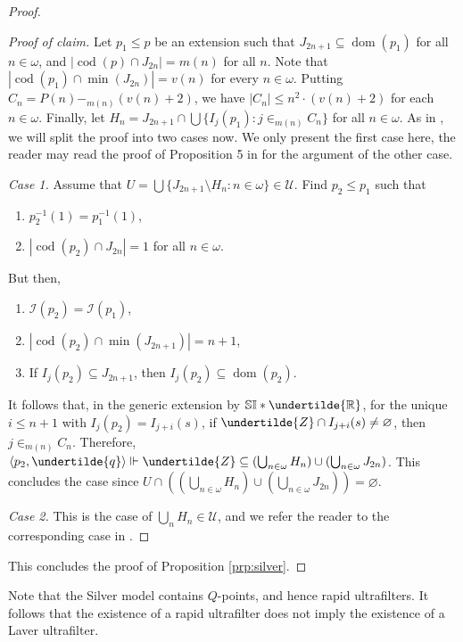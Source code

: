\documentclass[12pt]{article}
\theoremstyle{definition}
\newcommand\dom{\operatorname{dom}}
\begin{document}
\begin{proof}
\begin{proof}[Proof of claim]
Let $p_1\leq p$ be an extension such that $J_{2n+1}\subseteq \dom(p_1)$ for all $n\in\omega$, and $|\operatorname{cod}(p)\cap J_{2n}|=m(n)$ for all $n$. Note that $|\operatorname{cod}(p_1)\cap \min(J_{2n})|=v(n)$ for every $n\in\omega$. Putting $C_n=P(n)-_{m(n)}(v(n)+2)$, we have $|C_n|\leq n^2\cdot(v(n)+2)$ for each $n\in\omega$. Finally, let $H_n=J_{2n+1}\cap \bigcup\{I_j(p_1) : j\in_{m(n)} C_n\}$ for all $n\in\omega$. As in \cite{chodguz-ppoints}, we will split the proof into two cases now. We only present the first case here, the reader may read the proof of Proposition 5 in \cite{chodguz-ppoints} for the argument of the other case.

\emph{Case 1.} Assume that $U=\bigcup \{J_{2n+1}\setminus H_n : n\in\omega\}\in\mathcal{U}$. Find $p_2\leq p_1$ such that
\begin{enumerate}[label=(\roman*)]
    \item $p_2^{-1}(1)=p_1^{-1}(1)$,
    \item $|\operatorname{cod}(p_2)\cap J_{2n}|=1$ for all $n\in\omega$.
\end{enumerate}
But then,
\begin{enumerate}[label=(\roman*)]
    \item $\mathcal{I}(p_2)=\mathcal{I}(p_1)$,
    \item $|\operatorname{cod}(p_2)\cap \min(J_{2n+1})|=n+1$,
    \item If $I_j(p_2)\subseteq J_{2n+1}$, then $I_j(p_2)\subseteq \operatorname{dom}(p_2)$.
\end{enumerate}
It follows that, in the generic extension by $\mathbb{SI}*\undertilde{\mathbb{R}}$, for the unique $i\leq n+1$ with $I_j(p_2)=I_{j+i}(s)$, if $\undertilde{Z}\cap I_{j+i}(s)\neq\varnothing$, then $j\in_{m(n)} C_n$. Therefore, $\langle p_2, \undertilde{q}\rangle\Vdash \undertilde{Z}\subseteq (\bigcup_{n\in\omega} H_n)\cup(\bigcup_{n\in\omega}J_{2n})$. This concludes the case since $U\cap ((\bigcup_{n\in\omega} H_n)\cup(\bigcup_{n\in\omega}J_{2n}))=\varnothing$.

\emph{Case 2.} This is the case of $\bigcup_n H_n\in\mathcal{U}$, and we refer the reader to the corresponding case in \cite{chodguz-ppoints}.
\end{proof}
This concludes the proof of Proposition \ref{prp:silver}.
\end{proof}

Note that the Silver model contains $Q$-points, and hence rapid ultrafilters. It follows that the existence of a rapid ultrafilter does not imply the existence of a Laver ultrafilter.
\end{document}
